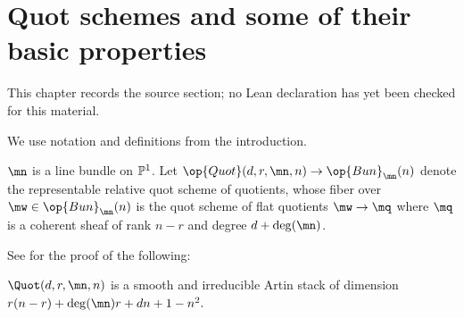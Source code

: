 \chapter{Quot schemes and some of their basic properties}
\label{rigid-local-systems-multiplicative-eigenvalue-problem-chapter-03}

\begin{remark}
\label{rigid-local-systems-multiplicative-eigenvalue-problem-chapter-03-source}
This chapter records the source section; no Lean declaration has yet been checked for this material.
\notready
\end{remark}

\label{quot1}
We use notation and definitions  from the introduction.
\begin{defi}
\notreadySuppose $\mn$ is a line bundle on $\Bbb{P}^1$. Let $\op{Quot}(d,r,\mn,n)\to \op{Bun}_{\mn}(n)$ denote the representable relative quot scheme of quotients, whose fiber over $\mw\in \op{Bun}_{\mn}(n)$ is the quot scheme of flat quotients $\mw\to\mq$ where $\mq$ is a coherent sheaf of rank $n-r$ and degree $d+\deg(\mn)$.
\end{defi}
See \cites{Laumon,CF} for the proof of the following:
\begin{proposition}
\notready\label{laumon}
$\Quot(d,r,\mn,n)$ is a smooth and irreducible Artin stack of dimension $r(n-r) +\deg(\mn)r +dn +1-n^2.$
\end{proposition}

